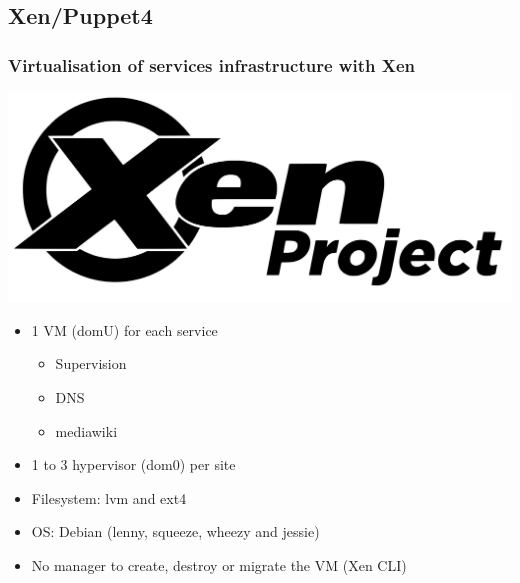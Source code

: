 \documentclass[11pt,compress]{beamer}
\begin{document}
\subsection{Xen/Puppet4}
\begin{frame}
\frametitle{Virtualisation of services infrastructure with Xen}
\begin{center}
\includegraphics[scale=0.04]{figures/xen}
\end{center}
\begin{itemize}
\item 1 VM (domU) for each service
\begin{itemize}
\item Supervision
\item DNS
\item mediawiki
\end{itemize}
\item 1 to 3 hypervisor (dom0) per site
\item Filesystem: lvm and ext4
\item OS: Debian (lenny, squeeze, wheezy and jessie)
\item No manager to create, destroy or migrate the VM (Xen CLI) 
\end{itemize}
\end{frame}
\end{document}
